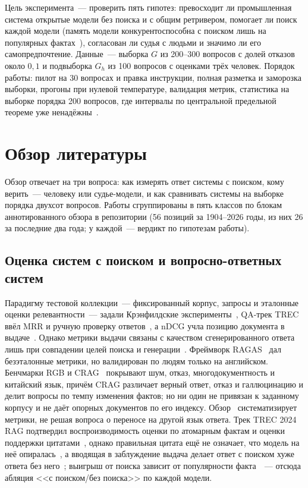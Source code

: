 \documentclass{article}
\begin{document}
Цель эксперимента~--- проверить пять гипотез: превосходит ли промышленная система открытые модели без поиска и с общим ретривером, помогает ли поиск каждой модели (память модели конкурентоспособна с поиском лишь на популярных фактах~\cite{mallen2022popqa}), согласован ли судья с людьми и значимо ли его самопредпочтение. Данные~--- выборка $G$ из 200--300 вопросов с долей отказов около $0{,}1$ и подвыборка $G_h$ из 100 вопросов с оценками трёх человек. Порядок работы: пилот на 30 вопросах и правка инструкции, полная разметка и заморозка выборки, прогоны при нулевой температуре, валидация метрик, статистика на выборке порядка 200 вопросов, где интервалы по центральной предельной теореме уже ненадёжны~\cite{bowyer2025position}.

\section{Обзор литературы}\label{sec:rw}

Обзор отвечает на три вопроса: как измерять ответ системы с поиском, кому верить~--- человеку или судье-модели, и как сравнивать системы на выборке порядка двухсот вопросов. Работы сгруппированы в пять классов по блокам аннотированного обзора в репозитории (56 позиций за 1904--2026 годы, из них 26 за последние два года; у каждой~--- вердикт по гипотезам работы).

\subsection{Оценка систем с поиском и вопросно-ответных систем}

Парадигму тестовой коллекции~--- фиксированный корпус, запросы и эталонные оценки релевантности~--- задали Крэнфилдские эксперименты~\cite{cleverdon1967cranfield}, QA-трек TREC ввёл MRR и ручную проверку ответов~\cite{voorhees1999trec8}, а nDCG учла позицию документа в выдаче~\cite{jarvelin2002cumulated}. Однако метрики выдачи связаны с качеством сгенерированного ответа лишь при совпадении целей поиска и генерации~\cite{samuel2026beyond}. Фреймворк RAGAS~\cite{es2023ragas} дал безэталонные метрики, но валидирован по людям только на английском. Бенчмарки RGB и CRAG~\cite{chen2023rgb,yang2024crag} покрывают шум, отказ, многодокументность и китайский язык, причём CRAG различает верный ответ, отказ и галлюцинацию и делит вопросы по темпу изменения фактов; но ни один не привязан к заданному корпусу и не даёт опорных документов по его индексу. Обзор~\cite{gan2025ragevaluation} систематизирует метрики, не решая вопроса о переносе на другой язык ответа. Трек TREC 2024 RAG подтвердил воспроизводимость оценки по атомарным фактам и оценки поддержки цитатами~\cite{pradeep2025nugget,thakur2025assessing}, однако правильная цитата ещё не означает, что модель на неё опиралась~\cite{wallat2025correctness}, а вводящая в заблуждение выдача делает ответ с поиском хуже ответа без него~\cite{zeng2025raguard}; выигрыш от поиска зависит от популярности факта~\cite{mallen2022popqa}~--- отсюда абляция <<с поиском/без поиска>> по каждой модели.
\end{document}
